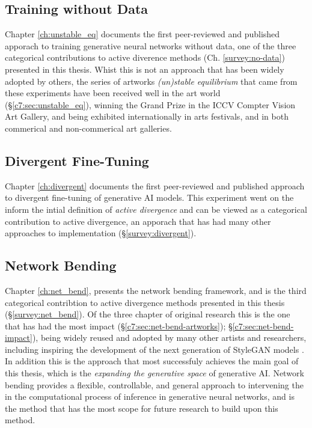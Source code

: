 \subsection{Training without Data}

Chapter \ref{ch:unstable_eq} documents the first peer-reviewed and published apporach to training generative neural networks without data, one of the three categorical contributions to active diverence methods (Ch. \ref{survey:no-data}) presented in this thesis.
Whist this is not an approach that has been widely adopted by others, the series of artworks \textit{(un)stable equilibrium} that came from these experiments have been received well in the art world (\S \ref{c7:sec:unstable_eq}), winning the Grand Prize in the ICCV Compter Vision Art Gallery, and being exhibited internationally in arts festivals, and in both commerical and non-commerical art galleries. 

\subsection{Divergent Fine-Tuning}

Chapter \ref{ch:divergent} documents the first peer-reviewed and published approach to divergent fine-tuning of generative AI models.
This experiment went on the inform the intial definition of \textit{active divergence} \citep{berns2020bridging} and can be viewed as a categorical contribution to active divergence, an apporach that has had many other approaches to implementation (\S \ref{survey:divergent}).


\subsection{Network Bending}

Chapter \ref{ch:net_bend}, presents the network bending framework, and is the third categorical contribtion to active divergence methods presented in this thesis (\S \ref{survey:net_bend}).
Of the three chapter of original research this is the one that has had the most impact  (\S \ref{c7:sec:net-bend-artworks}); \S \ref{c7:sec:net-bend-impact}), being widely reused and adopted by many other artists and researchers, including inspiring the development of the next generation of StyleGAN models \citep{karras2021alias}.
In addition this is the approach that most successfuly achieves the main goal of this thesis, which is the \textit{expanding the generative space} of generative AI. 
Network bending provides a flexible, controllable, and general approach to intervening the in the computational process of inference in generative neural networks, and is the method that has the most scope for future research to build upon this method.

